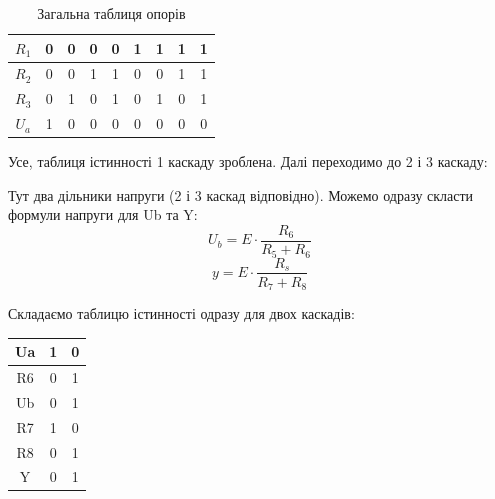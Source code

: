 \documentclass[a4paper,14pt]{extreport}
\begin{document}
\begin{table}[h]
\caption{Загальна таблиця опорів}
  \begin{center}
    \begin{tabular}{|c|c|c|c|c|c|c|c|c|}
    \hline
    $R_1 $  & 0 & 0 & 0 & 0 & 1 & 1 & 1 & 1   \\ \hline
    $R_2 $  & 0 & 0 & 1 & 1 & 0 & 0 & 1 & 1 \\ \hline
    $R_3 $  & 0 & 1 & 0 & 1 & 0 & 1 & 0 & 1 \\ \hline
    $U_a $  & 1 & 0 & 0 & 0 & 0 & 0 & 0 & 0\\ \hline
    \end{tabular}
  \end{center}
\end{table}
Усе, таблиця істинності 1 каскаду зроблена. Далі переходимо до 2 і 3 каскаду:\\
\begin{figure}[h!]
\label{ris5}
\end{figure}

Тут два дільники напруги (2 і 3 каскад відповідно). Можемо одразу скласти формули напруги для Ub та Y:
$$ U_b = E\cdot \dfrac{R_6}{R_5+R_6}$$
$$ y = E\cdot \dfrac{R_s}{R_7+R_8}$$

Складаємо таблицю істинності одразу для двох каскадів:

\begin{table}[h]
  \begin{center}
  \begin{tabular}{|c|c|c|}
  \hline
  Ua & 1 & 0 \\ \hline
  R6 & 0 & 1 \\ \hline
  Ub & 0 & 1 \\ \hline
  R7 & 1 & 0 \\ \hline
  R8 & 0 & 1 \\ \hline
  Y  & 0 & 1 \\ \hline
  \end{tabular}
  \end{center}
\end{table}
\end{document}
